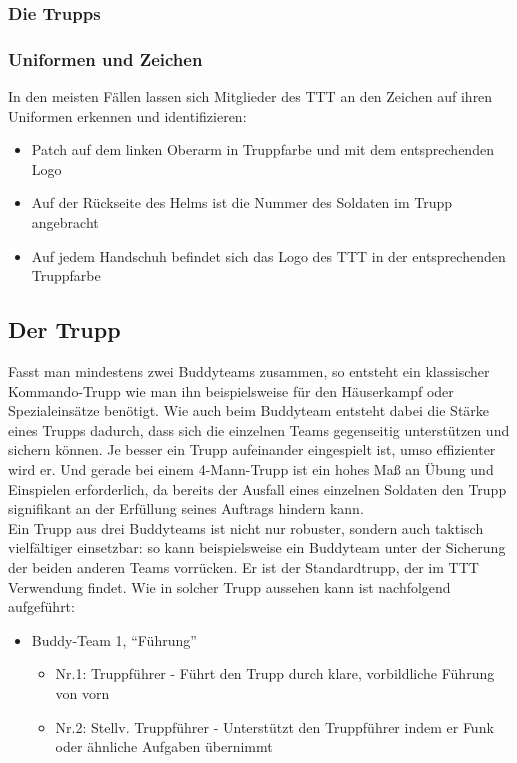 \subsubsection{Die Trupps}


\subsubsection{Uniformen und Zeichen}
	In den meisten Fällen lassen sich Mitglieder des \ac{TTT} an den Zeichen auf ihren Uniformen erkennen und identifizieren:
		\begin{itemize}
			\item Patch auf dem linken Oberarm in Truppfarbe und mit dem entsprechenden Logo
			\item Auf der Rückseite des Helms ist die Nummer des Soldaten im Trupp angebracht
			\item Auf jedem Handschuh befindet sich das Logo des \ac{TTT} in der entsprechenden Truppfarbe
		\end{itemize}

\subsection{Der Trupp}

Fasst man mindestens zwei Buddyteams zusammen, so entsteht ein klassischer Kommando-Trupp wie man ihn beispielsweise für den Häuserkampf oder Spezialeinsätze benötigt. Wie auch beim Buddyteam entsteht dabei die Stärke eines Trupps dadurch, dass sich die einzelnen Teams gegenseitig unterstützen und sichern können. Je besser ein Trupp aufeinander eingespielt ist, umso effizienter wird er. Und gerade bei einem 4-Mann-Trupp ist ein hohes Maß an Übung und Einspielen erforderlich, da bereits der Ausfall eines einzelnen Soldaten den Trupp signifikant an der Erfüllung seines Auftrags hindern kann. \\
	Ein Trupp aus drei Buddyteams ist nicht nur robuster, sondern auch taktisch vielfältiger einsetzbar: so kann beispielsweise ein Buddyteam unter der Sicherung der beiden anderen Teams vorrücken. Er ist der Standardtrupp, der im \ac{TTT} Verwendung findet. Wie in solcher Trupp aussehen kann ist nachfolgend aufgeführt:
		\begin{itemize}
			\item Buddy-Team 1, “Führung” 
			\begin{itemize}	
				\item Nr.1: Truppführer -  Führt den Trupp durch klare, vorbildliche Führung von vorn
				\item Nr.2: Stellv. Truppführer - Unterstützt den Truppführer indem er Funk oder ähnliche Aufgaben übernimmt
			\end{itemize}
		\end{itemize}


